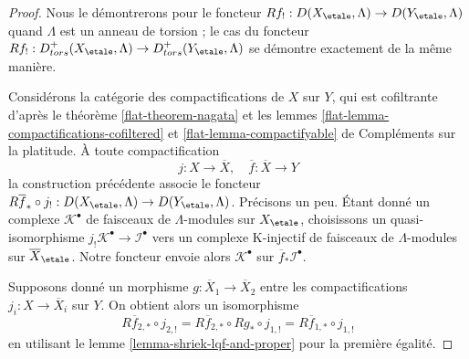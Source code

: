 \begin{proof}
Nous le démontrerons pour le foncteur
$Rf_! : D(X_\etale, \Lambda) \to D(Y_\etale, \Lambda)$
quand $\Lambda$ est un anneau de torsion ; le cas du foncteur
$Rf_! : D^+_{tors}(X_\etale, \Lambda) \to D^+_{tors}(Y_\etale, \Lambda)$
se démontre exactement de la même manière.

\medskip\noindent
Considérons la catégorie des compactifications de $X$ sur $Y$, qui est
cofiltrante d'après le théorème \ref{flat-theorem-nagata} et les
lemmes \ref{flat-lemma-compactifications-cofiltered} et
\ref{flat-lemma-compactifyable} de Compléments sur la platitude.
À toute compactification
$$
j : X \to \overline{X},\quad \overline{f} : \overline{X} \to Y
$$
la construction précédente associe le foncteur $R\overline{f}_* \circ j_! :
D(X_\etale, \Lambda) \to D(Y_\etale, \Lambda)$.
Précisons un peu. Étant donné un complexe $\mathcal{K}^\bullet$
de faisceaux de $\Lambda$-modules sur $X_\etale$, choisissons un quasi-isomorphisme
$j_!\mathcal{K}^\bullet \to \mathcal{I}^\bullet$ vers un complexe K-injectif
de faisceaux de $\Lambda$-modules sur $\overline{X}_\etale$.
Notre foncteur envoie alors $\mathcal{K}^\bullet$ sur
$\overline{f}_*\mathcal{I}^\bullet$.

\medskip\noindent
Supposons donné un morphisme $g : \overline{X}_1 \to \overline{X}_2$
entre les compactifications $j_i : X \to \overline{X}_i$ sur $Y$.
On obtient alors un isomorphisme
$$
R\overline{f}_{2, *} \circ j_{2, !} =
R\overline{f}_{2, *} \circ Rg_* \circ j_{1, !} =
R\overline{f}_{1, *} \circ j_{1, !}
$$
en utilisant le lemme \ref{lemma-shriek-lqf-and-proper} pour la première égalité.


\end{proof}
